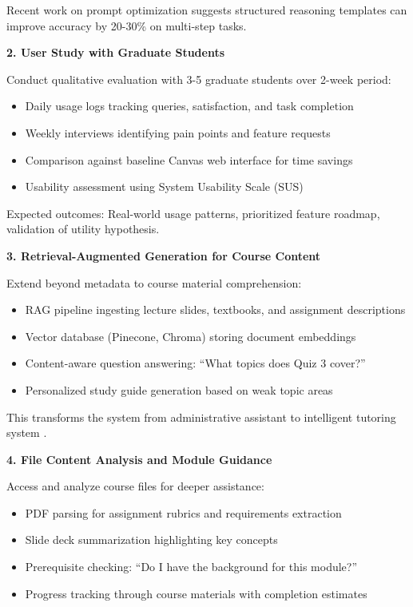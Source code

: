 \documentclass{article}
\begin{document}
Recent work on prompt optimization \cite{prompt2024engineering} suggests structured reasoning templates can improve accuracy by 20-30\% on multi-step tasks.

\textbf{2. User Study with Graduate Students}

Conduct qualitative evaluation with 3-5 graduate students over 2-week period:

\begin{itemize}
\item Daily usage logs tracking queries, satisfaction, and task completion
\item Weekly interviews identifying pain points and feature requests
\item Comparison against baseline Canvas web interface for time savings
\item Usability assessment using System Usability Scale (SUS) \cite{teachable2025agents}
\end{itemize}

Expected outcomes: Real-world usage patterns, prioritized feature roadmap, validation of utility hypothesis.

\textbf{3. Retrieval-Augmented Generation for Course Content}

Extend beyond metadata to course material comprehension:

\begin{itemize}
\item RAG pipeline ingesting lecture slides, textbooks, and assignment descriptions
\item Vector database (Pinecone, Chroma) storing document embeddings
\item Content-aware question answering: ``What topics does Quiz 3 cover?''
\item Personalized study guide generation based on weak topic areas
\end{itemize}

This transforms the system from administrative assistant to intelligent tutoring system \cite{teachable2025agents, education2025agentic}.

\textbf{4. File Content Analysis and Module Guidance}

Access and analyze course files for deeper assistance:

\begin{itemize}
\item PDF parsing for assignment rubrics and requirements extraction
\item Slide deck summarization highlighting key concepts
\item Prerequisite checking: ``Do I have the background for this module?''
\item Progress tracking through course materials with completion estimates
\end{itemize}
\end{document}
